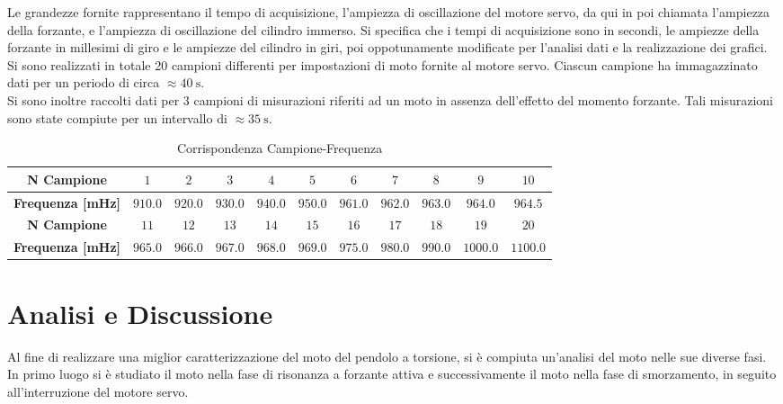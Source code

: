 \documentclass[a4paper,11pt,oneside]{article}
\begin{document}
Le grandezze fornite rappresentano il tempo di acquisizione, l'ampiezza di oscillazione del motore servo, da qui in poi chiamata l'ampiezza della forzante, e l'ampiezza di oscillazione del cilindro immerso. Si specifica che i tempi di acquisizione sono in secondi, le ampiezze della forzante in millesimi di giro e le ampiezze del cilindro in giri, poi oppotunamente modificate per l'analisi dati e la realizzazione dei grafici.\\
Si sono realizzati in totale 20 campioni differenti per impostazioni di moto fornite al  motore servo. Ciascun campione ha immagazzinato dati per un periodo di circa $\approx \SI{40}{\second}$.\\
Si sono inoltre raccolti dati per 3 campioni di misurazioni riferiti ad un moto in assenza dell'effetto del momento forzante. Tali misurazioni sono state compiute per un intervallo di $\approx  \SI{35}{\second}$.


\begin{table}[h!]
    \centering
    \begin{tabular}{|c|c|c|c|c|c|c|c|c|c|c|}
        \hline
        \textbf{N Campione} & $1$ & $2$ & $3$ & $4$ & $5$ & $6$ & $7$ & $8$ & $9$ & $10$ \\ \hline
        \textbf{Frequenza [\si{\milli\hertz}]} & $910.0$ & $920.0$ & $930.0$ & $940.0$ & $950.0$ & $961.0$ & $962.0$ & $963.0$ & $964.0$ & $964.5$\\ \hline \hline
        \textbf{N Campione} & $11$ & $12$ & $13$ & $14$ & $15$ & $16$ & $17$ & $18$ & $19$ & $20$\\ \hline
        \textbf{Frequenza [\si{\milli\hertz}]} & $965.0$ & $966.0$ & $967.0$ & $968.0$ & $969.0$ & $975.0$ & $980.0$ & $990.0$ & $1000.0$ & $1100.0$\\ \hline
    \end{tabular}
    \caption{Corrispondenza Campione-Frequenza}
    \label{tab:corrispondenza_campione_frequenza}
\end{table}


\section{Analisi e Discussione}
Al fine di realizzare una miglior caratterizzazione del moto del pendolo a torsione, si è compiuta un'analisi del moto nelle sue diverse fasi.\\
In primo luogo si è studiato il moto nella fase di risonanza a forzante attiva e successivamente il moto nella fase di smorzamento, in seguito all'interruzione del motore servo.
\end{document}
